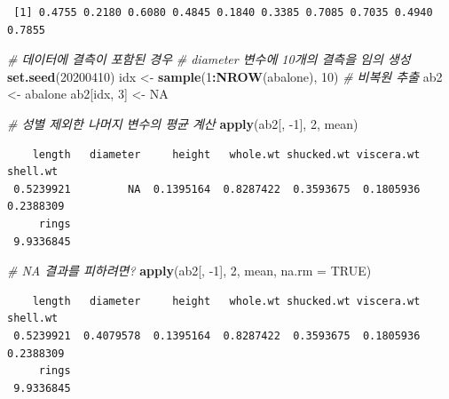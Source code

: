 \documentclass[
  11pt,
]{krantz}
\newenvironment{Shaded}{\begin{snugshade}}{\end{snugshade}}
\newcommand{\CommentTok}[1]{\textcolor[rgb]{0.37,0.37,0.37}{\textit{#1}}}
\newcommand{\DataTypeTok}[1]{\textcolor[rgb]{0.27,0.27,0.27}{#1}}
\newcommand{\DecValTok}[1]{\textcolor[rgb]{0.06,0.06,0.06}{#1}}
\newcommand{\KeywordTok}[1]{\textcolor[rgb]{0.27,0.27,0.27}{\textbf{#1}}}
\newcommand{\NormalTok}[1]{#1}
\newcommand{\OperatorTok}[1]{\textcolor[rgb]{0.43,0.43,0.43}{\textbf{#1}}}
\newcommand{\OtherTok}[1]{\textcolor[rgb]{0.37,0.37,0.37}{#1}}
\newcommand{\StringTok}[1]{\textcolor[rgb]{0.5,0.5,0.5}{#1}}
\begin{document}
\begin{verbatim}
 [1] 0.4755 0.2180 0.6080 0.4845 0.1840 0.3385 0.7085 0.7035 0.4940 0.7855
\end{verbatim}

\begin{Shaded}
\begin{Highlighting}[]
\CommentTok{# 데이터에 결측이 포함된 경우}
\CommentTok{# diameter 변수에 10개의 결측을 임의 생성}
\KeywordTok{set.seed}\NormalTok{(}\DecValTok{20200410}\NormalTok{)}
\NormalTok{idx <-}\StringTok{ }\KeywordTok{sample}\NormalTok{(}\DecValTok{1}\OperatorTok{:}\KeywordTok{NROW}\NormalTok{(abalone), }\DecValTok{10}\NormalTok{) }\CommentTok{# 비복원 추출}
\NormalTok{ab2 <-}\StringTok{ }\NormalTok{abalone}
\NormalTok{ab2[idx, }\DecValTok{3}\NormalTok{] <-}\StringTok{ }\OtherTok{NA}

\CommentTok{# 성별 제외한 나머지 변수의 평균 계산}
\KeywordTok{apply}\NormalTok{(ab2[, }\DecValTok{-1}\NormalTok{], }\DecValTok{2}\NormalTok{, mean)}
\end{Highlighting}
\end{Shaded}

\begin{verbatim}
    length   diameter     height   whole.wt shucked.wt viscera.wt   shell.wt 
 0.5239921         NA  0.1395164  0.8287422  0.3593675  0.1805936  0.2388309 
     rings 
 9.9336845 
\end{verbatim}

\begin{Shaded}
\begin{Highlighting}[]
\CommentTok{# NA 결과를 피하려면?}
\KeywordTok{apply}\NormalTok{(ab2[, }\DecValTok{-1}\NormalTok{], }\DecValTok{2}\NormalTok{, mean, }\DataTypeTok{na.rm =} \OtherTok{TRUE}\NormalTok{)}
\end{Highlighting}
\end{Shaded}

\begin{verbatim}
    length   diameter     height   whole.wt shucked.wt viscera.wt   shell.wt 
 0.5239921  0.4079578  0.1395164  0.8287422  0.3593675  0.1805936  0.2388309 
     rings 
 9.9336845 
\end{verbatim}

\normalsize

\footnotesize
\end{document}

